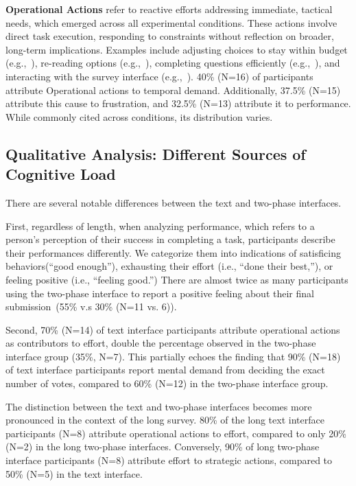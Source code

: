 \textbf{Operational Actions} refer to reactive efforts addressing immediate, tactical needs, which emerged across all experimental conditions. These actions involve direct task execution, responding to constraints without reflection on broader, long-term implications. Examples include adjusting choices to stay within budget (e.g.,~), re-reading options (e.g.,~), completing questions efficiently (e.g.,~), and interacting with the survey interface (e.g.,~). 40\% (N=16) of participants attribute Operational actions to temporal demand. Additionally, 37.5\% (N=15) attribute this cause to frustration, and 32.5\% (N=13) attribute it to performance. While commonly cited across conditions, its distribution varies.

\subsection{Qualitative Analysis: Different Sources of Cognitive Load}
\label{sec:cog_diff}
There are several notable differences between the text and two-phase interfaces. 

First, regardless of length, when analyzing performance, which refers to a person's perception of their success in completing a task, participants describe their performances differently. We categorize them into indications of satisficing behaviors(``good enough''), exhausting their effort (i.e., ``done their best,''), or feeling positive (i.e., ``feeling good.'') There are almost twice as many participants using the two-phase interface to report a positive feeling about their final submission~(55\% v.s 30\% (N=11 vs. 6)).

Second, 70\% (N=14) of text interface participants attribute operational actions as contributors to effort, double the percentage observed in the two-phase interface group (35\%, N=7). This partially echoes the finding that 90\% (N=18) of text interface participants report mental demand from deciding the exact number of votes, compared to 60\% (N=12) in the two-phase interface group.

The distinction between the text and two-phase interfaces becomes more pronounced in the context of the long survey. 80\% of the long text interface participants (N=8) attribute operational actions to effort, compared to only 20\% (N=2) in the long two-phase interfaces. Conversely, 90\% of long two-phase interface participants (N=8) attribute effort to strategic actions, compared to 50\% (N=5) in the text interface. 

